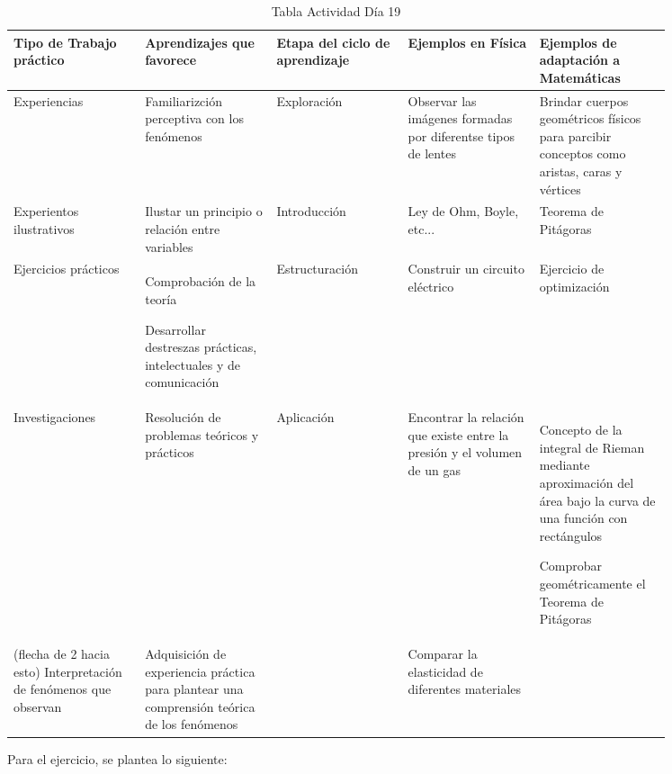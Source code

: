 \documentclass[12pt]{report}
\newcounter{it}
\theoremstyle{largebreak}
\begin{document}
    \begin{table}[ht]
        \centering
        \begin{tabular}{p{0.17\linewidth} | p{0.17\linewidth} | p{0.17\linewidth} | p{0.17\linewidth} | p{0.17\linewidth}}
            Tipo de Trabajo práctico & Aprendizajes que favorece & Etapa del ciclo de aprendizaje & Ejemplos en Física & Ejemplos de adaptación a Matemáticas \\
            \hline
            Experiencias & Familiarizción perceptiva con los fenómenos & Exploración & Observar las imágenes formadas por diferentse tipos de lentes & Brindar cuerpos geométricos físicos para parcibir conceptos como aristas, caras y vértices \\
            Experientos ilustrativos & Ilustar un principio o relación entre variables & Introducción & Ley de Ohm, Boyle, etc... & Teorema de Pitágoras \\
            Ejercicios prácticos & Comprobación de la teoría
                
                Desarrollar destreszas prácticas, intelectuales y de comunicación
            & Estructuración & Construir un circuito eléctrico & Ejercicio de optimización \\
            Investigaciones & Resolución de problemas teóricos y prácticos & Aplicación & Encontrar la relación que existe entre la presión y el volumen de un gas & Concepto de la integral de Rieman mediante aproximación del área bajo la curva de una función con rectángulos
            
            Comprobar geométricamente el Teorema de Pitágoras \\
            (flecha de 2 hacia esto) Interpretación de fenómenos que observan & Adquisición de experiencia práctica para plantear una comprensión teórica de los fenómenos & & Comparar la elasticidad de diferentes materiales & \\
        \end{tabular}
        \caption{Tabla Actividad Día 19}
        \label{tab:my_label}
    \end{table}

    Para el ejercicio, se plantea lo siguiente:
\end{document}

